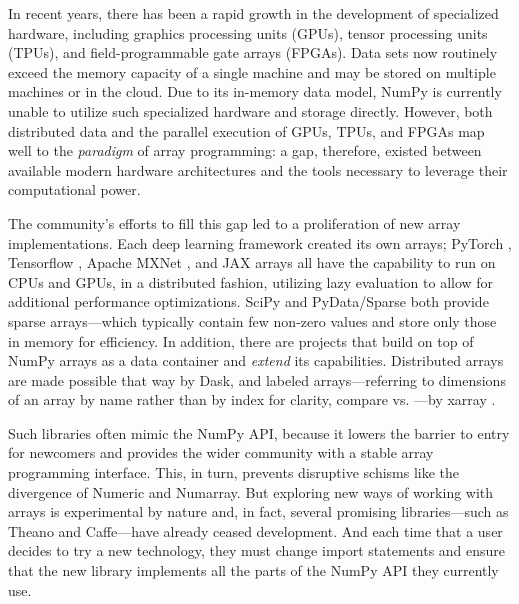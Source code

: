 


In recent years, there has been a rapid growth in the development of
specialized hardware, including graphics processing
units (GPUs), tensor processing units (TPUs), and field-programmable
gate arrays (FPGAs).  Data sets now routinely exceed the memory capacity of a single machine and may be stored on multiple machines or in
the cloud.  Due to its in-memory data model, NumPy is currently unable to
utilize such specialized hardware and storage directly.  However, both
distributed data and the parallel execution of GPUs, TPUs, and FPGAs map well
to the \emph{paradigm} of array programming: a gap, therefore, existed between
available modern hardware architectures and the tools necessary to
leverage their computational power.

The community's efforts to fill this gap led to a
proliferation of new array implementations. Each deep learning framework created
its own arrays; PyTorch \cite{NEURIPS2019_9015},
Tensorflow \cite{abadi2016tensorflow}, Apache MXNet \cite{chen2015mxnet},
and JAX arrays all have the
capability to run on CPUs and GPUs, in a distributed fashion, utilizing lazy evaluation
to allow for additional performance optimizations.  SciPy and PyData/Sparse both
provide sparse arrays---which typically contain few non-zero values and store
only those in memory for efficiency.
In addition, there are projects that build on top of NumPy arrays as a data
container and \textit{extend} its capabilities.  Distributed arrays are
made possible that way by Dask, and labeled arrays---referring to dimensions of
an array by name rather than by index for clarity, compare  vs.
---by xarray \cite{hoyer2017xarray}.

Such libraries often mimic the NumPy API, because it lowers the
barrier to entry for newcomers and provides the wider community with a
stable array programming interface. This, in turn, prevents disruptive
schisms like the divergence of Numeric and Numarray.
But exploring new ways of working with arrays is experimental by nature
and, in fact, several promising libraries---such as Theano and Caffe---have
already ceased development. And each time that a user
decides to try a new technology, they must
change import statements and ensure that the new library implements
all the parts of the NumPy API they currently use.

